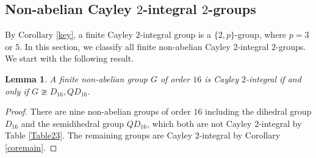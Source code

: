 \documentclass{amsart}
\newtheorem{lem}[thm]{Lemma}
\def\Cay{{\sf Cay}} \def\Ker{{\sf Ker}}
\begin{document}
\subsection{Non-abelian Cayley $2$-integral $2$-groups}

By Corollary \ref{key}, a finite Cayley $2$-integral group is a $\{2,p\}$-group, where $p=3$ or $5$. In this section, we  classify all finite non-abelian Cayley $2$-integral $2$-groups. We start with the following result.

\begin{lem}\label{16}
	A finite non-abelian group $G$ of order $16$ is Cayley $2$-integral if and only if $G\ncong D_{16}, QD_{16}$.
\end{lem}
\begin{proof}
	There are nine non-abelian groups of order $16$ including the dihedral group $D_{16}$ and the semidihedral group $QD_{16}$, which both are not Cayley $2$-integral by Table \ref{Table23}. The remaining groups are Cayley $2$-integral by Corollary \ref{coremain}.
\end{proof}







	
\end{document}

